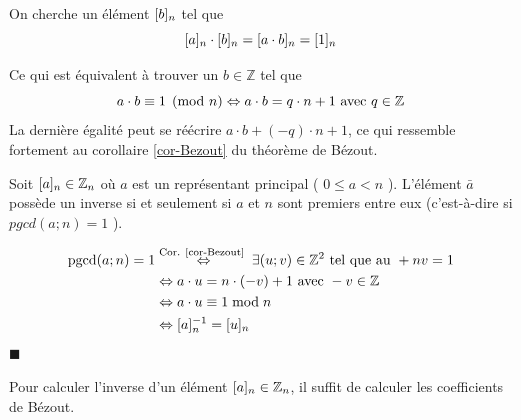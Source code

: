 On cherche un élément $[b]_{n}$ tel que $$[a]_{n}\cdot [b]_{n} = [a\cdot b]_{n} = [1]_{n}$$

Ce qui est équivalent à trouver un $b \in \mathbb{Z}$ tel que 
$$a \cdot b \equiv 1 \pmod n \hspace{0mm}\Leftrightarrow\hspace{0mm} a \cdot b = q\cdot n + 1 \text{ avec } q\in \mathbb{Z} $$
La dernière égalité peut se réécrire $ a \cdot b + (-q)\cdot n + 1 $, ce qui ressemble fortement au corollaire \ref{cor-Bezout} du théorème de Bézout.

\begin{proposition}
  Soit $[a]_{n} \in \mathbb{Z}_n$ où $a$ est un représentant principal ( $0 \leq a<n$ ).
L'élément $\bar{a}$ possède un inverse si et seulement si $a$ et $n$ sont premiers entre eux (c'est-à-dire si $pgcd(a ; n)=1$ ).
\end{proposition}

\medskip

\begin{demonstration}
$$
\begin{aligned}
	\operatorname{pgcd}(a ; n)=  1 &\stackrel{\text {Cor. \ref{cor-Bezout} }}{\Leftrightarrow} \exists(u ; v) \in \mathbb{Z}^2 \text { tel que au }+n v=1 \\
	& \Leftrightarrow a \cdot u=n \cdot(-v)+1 \text { avec }-v \in \mathbb{Z} \\
	& \Leftrightarrow a \cdot u \equiv 1 \bmod n \\
	& \Leftrightarrow [a]_{n} ^{-1} = [u]_{n}
\end{aligned}
$$
\vspace{-3mm}\hfill $\blacksquare$
\end{demonstration}	

\medskip

\begin{remarque}
	Pour calculer l'inverse d'un élément $[a]_{n} \in \mathbb{Z}_n$, il suffit de calculer les coefficients de Bézout.
\end{remarque}


\medskip

